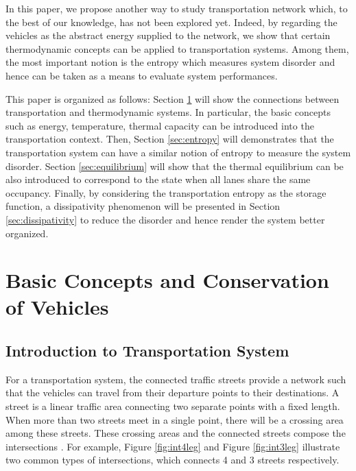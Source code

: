 \documentclass[preprint,authoryear,12pt]{elsarticle}
\begin{document}
In this paper, we propose another way to study transportation network
which, to the best of our knowledge,  has not been explored yet.
Indeed, by regarding the vehicles as the abstract energy supplied to
the network, we show that certain thermodynamic concepts can be
applied to transportation systems. Among them, the most important
notion is the entropy which measures system disorder and hence can be
taken as a means to evaluate system performances.

This paper is organized as follows: Section \ref{sec:concepts} will
show the connections between transportation and thermodynamic
systems. In particular, the basic concepts such as energy,
temperature, thermal capacity can be introduced into the
transportation context. Then, Section \ref{sec:entropy} will
demonstrates that the transportation system can have a similar notion
of entropy to measure the system disorder.
Section \ref{sec:equilibrium} will show that the thermal equilibrium
can be also introduced to correspond to the state when all lanes share
the same occupancy.
Finally, by considering the transportation entropy as the storage
function, a dissipativity phenomenon will be presented in Section
\ref{sec:dissipativity} to reduce the disorder and hence render the
system better organized.

\section{Basic Concepts and Conservation of Vehicles}\label{sec:concepts}

\subsection{Introduction to Transportation System}

For a transportation system, the connected traffic streets provide a
network such that the vehicles can travel from their departure points
to their destinations. A street is a linear traffic area connecting
two separate points with a fixed length. When more than two streets
meet in a single point, there will be a crossing area among these
streets. These crossing areas and the connected streets compose the
intersections \citep{papageorgiou_review_2003}. For example, Figure
\ref{fig:int4leg} and Figure \ref{fig:int3leg} illustrate two common
types of intersections, which connects 4 and 3 streets respectively.
\end{document}
